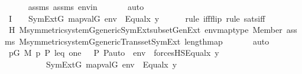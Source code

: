 \begin{isabellebody}
\ \ \ \ \isamarkupfalse%
\ assms{}\ assms\ envin\ \isanewline
\ \ \ \ \isamarkupfalse%
\ auto\isanewline
\ \ \isamarkupfalse%
\ I{}\ {\isacharcolon}{\kern0pt}\ {\isachardoublequoteopen}{\isachardot}{\kern0pt}{\isachardot}{\kern0pt}{\isachardot}{\kern0pt}\ {\isasymlongleftrightarrow}\ SymExt{\isacharparenleft}{\kern0pt}G{\isacharparenright}{\kern0pt}{\isacharcomma}{\kern0pt}\ map{\isacharparenleft}{\kern0pt}val{\isacharparenleft}{\kern0pt}G{\isacharparenright}{\kern0pt}{\isacharcomma}{\kern0pt}\ env{\isacharparenright}{\kern0pt}\ {\isasymTurnstile}\ Equal{\isacharparenleft}{\kern0pt}x{\isacharcomma}{\kern0pt}\ y{\isacharparenright}{\kern0pt}{\isachardoublequoteclose}\ \isanewline
\ \ \ \ \isamarkupfalse%
{\isacharparenleft}{\kern0pt}rule\ iff{\isacharunderscore}{\kern0pt}flip{\isacharcomma}{\kern0pt}\ rule\ {\isasymDelta}{}{\isacharunderscore}{\kern0pt}sats{\isacharunderscore}{\kern0pt}iff{\isacharparenright}{\kern0pt}\isanewline
\ \ \ \ \isamarkupfalse%
\ H\ M{\isacharunderscore}{\kern0pt}symmetric{\isacharunderscore}{\kern0pt}system{\isacharunderscore}{\kern0pt}G{\isacharunderscore}{\kern0pt}generic{\isachardot}{\kern0pt}SymExt{\isacharunderscore}{\kern0pt}subset{\isacharunderscore}{\kern0pt}GenExt\ envmaptype\ Member{\isacharunderscore}{\kern0pt}{\isasymDelta}{}\ assms{}\ M{\isacharunderscore}{\kern0pt}symmetric{\isacharunderscore}{\kern0pt}system{\isacharunderscore}{\kern0pt}G{\isacharunderscore}{\kern0pt}generic{\isachardot}{\kern0pt}Transset{\isacharunderscore}{\kern0pt}SymExt\ length{\isacharunderscore}{\kern0pt}map\ \isanewline
\ \ \ \ \isamarkupfalse%
\ auto\isanewline
\ \ \isamarkupfalse%
\ {\isachardoublequoteopen}{\isacharparenleft}{\kern0pt}{\isasymexists}p{\isasymin}G{\isachardot}{\kern0pt}\ M{\isacharcomma}{\kern0pt}\ {\isacharbrackleft}{\kern0pt}p{\isacharcomma}{\kern0pt}\ P{\isacharcomma}{\kern0pt}\ leq{\isacharcomma}{\kern0pt}\ one{\isacharcomma}{\kern0pt}\ {\isasymlangle}{\isasymF}{\isacharcomma}{\kern0pt}\ {\isasymG}{\isacharcomma}{\kern0pt}\ P{\isacharcomma}{\kern0pt}\ P{\isacharunderscore}{\kern0pt}auto{\isasymrangle}{\isacharbrackright}{\kern0pt}\ {\isacharat}{\kern0pt}\ env\ {\isasymTurnstile}\ forcesHS{\isacharparenleft}{\kern0pt}Equal{\isacharparenleft}{\kern0pt}x{\isacharcomma}{\kern0pt}\ y{\isacharparenright}{\kern0pt}{\isacharparenright}{\kern0pt}{\isacharparenright}{\kern0pt}\ {\isasymlongleftrightarrow}\isanewline
\ \ \ \ \ \ \ \ \ \ SymExt{\isacharparenleft}{\kern0pt}G{\isacharparenright}{\kern0pt}{\isacharcomma}{\kern0pt}\ map{\isacharparenleft}{\kern0pt}val{\isacharparenleft}{\kern0pt}G{\isacharparenright}{\kern0pt}{\isacharcomma}{\kern0pt}\ env{\isacharparenright}{\kern0pt}\ {\isasymTurnstile}\ Equal{\isacharparenleft}{\kern0pt}x{\isacharcomma}{\kern0pt}\ y{\isacharparenright}{\kern0pt}{\isachardoublequoteclose}\isanewline

\end{isabellebody}
